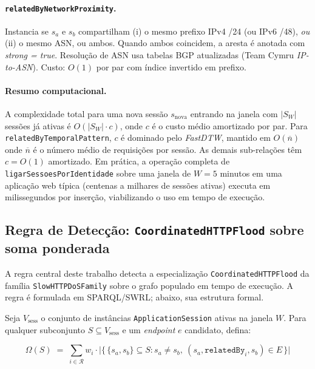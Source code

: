 \documentclass[preprint,12pt]{elsarticle}
\begin{document}
\paragraph{\texttt{relatedByNetworkProximity}.} Instancia se $s_a$ e $s_b$ compartilham (i) o mesmo prefixo IPv4 /24 (ou IPv6 /48), \emph{ou} (ii) o mesmo ASN, ou ambos. Quando ambos coincidem, a aresta é anotada com \emph{strong = true}. Resolução de ASN usa tabelas BGP atualizadas (Team Cymru \emph{IP-to-ASN}). Custo: $O(1)$ por par com índice invertido em prefixo.

\paragraph{Resumo computacional.} A complexidade total para uma nova sessão $s_{\text{nova}}$ entrando na janela com $|S_W|$ sessões já ativas é $O(|S_W| \cdot c)$, onde $c$ é o custo médio amortizado por par. Para \texttt{relatedByTemporalPattern}, $c$ é dominado pelo \emph{FastDTW}, mantido em $O(\overline{n})$ onde $\overline{n}$ é o número médio de requisições por sessão. As demais sub-relações têm $c = O(1)$ amortizado. Em prática, a operação completa de \texttt{ligarSessoesPorIdentidade} sobre uma janela de $W = 5$ minutos em uma aplicação web típica (centenas a milhares de sessões ativas) executa em milissegundos por inserção, viabilizando o uso em tempo de execução.

\subsection{Regra de Detecção: \texttt{CoordinatedHTTPFlood} sobre soma ponderada}
\label{sec:approach:rules}

A regra central deste trabalho detecta a especialização \texttt{CoordinatedHTTPFlood} da família \texttt{SlowHTTPDoSFamily} sobre o grafo populado em tempo de execução. A regra é formulada em SPARQL/SWRL; abaixo, sua estrutura formal.

Seja $V_{\text{sess}}$ o conjunto de instâncias \texttt{ApplicationSession} ativas na janela $W$. Para qualquer subconjunto $S \subseteq V_{\text{sess}}$ e um \emph{endpoint} $e$ candidato, defina:

\begin{equation}
    \Omega(S) \;=\; \sum_{i \in \mathcal{R}} w_i \cdot \big|\{\, \{s_a, s_b\} \subseteq S : s_a \ne s_b,\ (s_a, \texttt{relatedBy}_i, s_b) \in E \,\}\big|
    \label{eq:cluster-score}
\end{equation}
\end{document}
